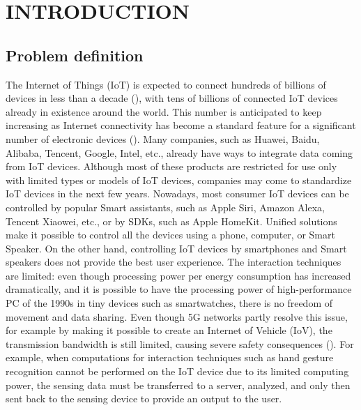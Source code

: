 
\chapter{INTRODUCTION}

\section{Problem definition}

The Internet of Things (IoT) is expected to connect hundreds of billions of devices in less than a decade (\cite{simiscuka_synchronisation_2018}), with tens of billions of connected IoT devices already in existence around the world. This number is anticipated to keep increasing as Internet connectivity has become a standard feature for a significant number of electronic devices (\cite{hu_virtual_2021}). Many companies, such as Huawei, Baidu, Alibaba, Tencent, Google, Intel, etc., already have ways to integrate data coming from IoT devices. Although most of these products are restricted for use only with limited types or models of IoT devices, companies may come to standardize IoT devices in the next few years. Nowadays, most consumer IoT devices can be controlled by popular Smart assistants, such as Apple Siri, Amazon Alexa, Tencent Xiaowei, etc., or by SDKs, such as Apple HomeKit. Unified solutions make it possible to control all the devices using a phone, computer, or Smart Speaker.
On the other hand, controlling IoT devices by smartphones and Smart speakers does not provide the best user experience. The interaction techniques are limited: even though processing power per energy consumption has increased dramatically, and it is possible to have the processing power of high-performance PC of the 1990s in tiny devices such as smartwatches, there is no freedom of movement and data sharing. Even though 5G networks partly resolve this issue, for example by making it possible to create an Internet of Vehicle (IoV), the transmission bandwidth is still limited, causing severe safety consequences (\cite{hu_virtual_2021}). For example, when computations for interaction techniques such as hand gesture recognition cannot be performed on the IoT device due to its limited computing power, the sensing data must be transferred to a server, analyzed, and only then sent back to the sensing device to provide an output to the user.

